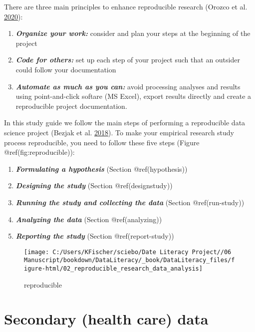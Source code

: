 \documentclass[
]{book}
\providecommand{\tightlist}{%
  \setlength{\itemsep}{0pt}\setlength{\parskip}{0pt}}
\begin{document}
There are three main principles to enhance reproducible research (Orozco
et al. \protect\hyperlink{ref-orozco_how_2020}{2020}):

\begin{enumerate}
\def\labelenumi{\arabic{enumi}.}
\tightlist
\item
  \textbf{\emph{Organize your work:}} consider and plan your steps at
  the beginning of the project
\item
  \textbf{\emph{Code for others:}} set up each step of your project such
  that an outsider could follow your documentation
\item
  \textbf{\emph{Automate as much as you can:}} avoid processing analyses
  and results using point-and-click softare (MS Excel), export results
  directly and create a reproducible project documentation.
\end{enumerate}

In this study guide we follow the main steps of performing a
reproducible data science project (Bezjak et al.
\protect\hyperlink{ref-bezjak_open_2018}{2018}). To make your empirical
research study process reproducible, you need to follow these five steps
(Figure @ref(fig:reproducible)):

\begin{enumerate}
\def\labelenumi{\arabic{enumi}.}
\tightlist
\item
  \textbf{\emph{Formulating a hypothesis}} (Section @ref(hypothesis))
\item
  \textbf{\emph{Designing the study}} (Section @ref(designstudy))
\item
  \textbf{\emph{Running the study and collecting the data}} (Section
  @ref(run-study))
\item
  \textbf{\emph{Analyzing the data}} (Section @ref(analyzing))
\item
  \textbf{\emph{Reporting the study}} (Section @ref(report-study))
\end{enumerate}

\begin{figure}

{\centering \texttt{[image: C:/Users/KFischer/sciebo/Date Literacy Project//06 Manuscript/bookdown/DataLiteracy/\_book/DataLiteracy\_files/figure-html/02\_reproducible\_research\_data\_analysis]} 

}

\caption{reproducible}\label{fig:unnamed-chunk-2}
\end{figure}

\hypertarget{secondary-health-care-data}{%
\section{Secondary (health care)
data}\label{secondary-health-care-data}}
\end{document}
